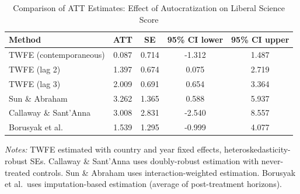 \begin{table}[htbp]
\centering
\caption{Comparison of ATT Estimates: Effect of Autocratization on Liberal Science Score}
\label{tab:did_comparison_libscore}
\begin{tabular}{lcccc}
\toprule
Method & ATT & SE & 95\% CI lower & 95\% CI upper \\
\midrule
TWFE (contemporaneous) & 0.087 & 0.714 & -1.312 & 1.487 \\
TWFE (lag 2) & 1.397 & 0.674 & 0.075 & 2.719 \\
TWFE (lag 3) & 2.009 & 0.691 & 0.654 & 3.364 \\
Sun \& Abraham & 3.262 & 1.365 & 0.588 & 5.937 \\
Callaway \& Sant'Anna & 3.008 & 2.831 & -2.540 & 8.557 \\
Borusyak et al. & 1.539 & 1.295 & -0.999 & 4.077 \\
\bottomrule
\end{tabular}
\begin{tablenotes}
\small
\item \textit{Notes:} TWFE estimated with country and year fixed effects, heteroskedasticity-robust SEs.
Callaway \& Sant'Anna uses doubly-robust estimation with never-treated controls.
Sun \& Abraham uses interaction-weighted estimation.
Borusyak et al.\ uses imputation-based estimation (average of post-treatment horizons).
\end{tablenotes}
\end{table}
